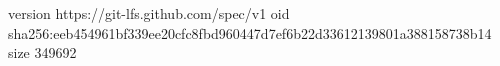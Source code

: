version https://git-lfs.github.com/spec/v1
oid sha256:eeb454961bf339ee20cfc8fbd960447d7ef6b22d33612139801a388158738b14
size 349692
